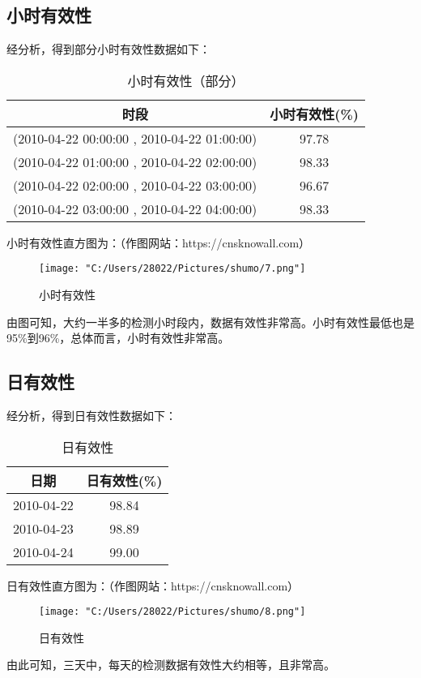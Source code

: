 \documentclass[withoutpreface,bwprint]{cumcmthesis} %
\begin{document}
    \subsection{小时有效性}
    经分析，得到部分小时有效性数据如下：\par
    \begin{table}[!htbp]
        \centering
        \caption{小时有效性（部分）}
        \begin{tabular}{cc} 
            \toprule[1.5pt]
            时段 & 小时有效性(\%) \\ 
            \midrule 
            (2010-04-22 00:00:00 , 2010-04-22 01:00:00) & 97.78 \\
            (2010-04-22 01:00:00 , 2010-04-22 02:00:00) & 98.33 \\
            (2010-04-22 02:00:00 , 2010-04-22 03:00:00) & 96.67 \\
            (2010-04-22 03:00:00 , 2010-04-22 04:00:00) & 98.33 \\
            \bottomrule[1.5pt]
        \end{tabular}
    \end{table}\par
    小时有效性直方图为：（作图网站：https://cnsknowall.com）\newpage
    \begin{figure}[!htbp] 
        \centering
        \texttt{[image: "C:/Users/28022/Pictures/shumo/7.png"]}
        \caption{小时有效性}
        \label{fig:your_label}
    \end{figure}\par
    由图可知，大约一半多的检测小时段内，数据有效性非常高。小时有效性最低也是95\%到96\%，总体而言，小时有效性非常高。

    \subsection{日有效性}
    经分析，得到日有效性数据如下：\par
    \begin{table}[!htbp]
        \centering
        \caption{日有效性}
        \begin{tabular}{cc} 
            \toprule[1.5pt]
            日期 & 日有效性(\%) \\ 
            \midrule 
            2010-04-22 & 98.84 \\
            2010-04-23 & 98.89 \\
            2010-04-24 & 99.00 \\
            \bottomrule[1.5pt]
        \end{tabular}
    \end{table}\par
    日有效性直方图为：（作图网站：https://cnsknowall.com）\newpage
    \begin{figure}[!htbp] 
        \centering
        \texttt{[image: "C:/Users/28022/Pictures/shumo/8.png"]}
        \caption{日有效性}
        \label{fig:your_label}
    \end{figure}\par
    由此可知，三天中，每天的检测数据有效性大约相等，且非常高。
\end{document}
